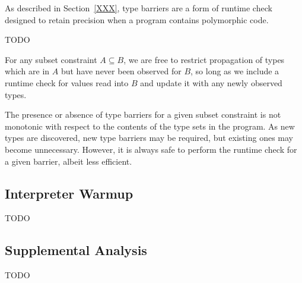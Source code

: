 As described in Section~\ref{XXX}, type barriers are a form of runtime
check designed to retain precision when a program contains polymorphic code.

TODO

For any subset constraint $A \subseteq B$, we are free to restrict
propagation of types which are in $A$ but have never been observed for $B$,
so long as we include a runtime check for values read into $B$ and update
it with any newly observed types.

The presence or absence of type barriers for a given subset constraint
is not monotonic with respect to the contents of the type sets in the program.
As new types are discovered, new type barriers may be required, but existing
ones may become unnecessary.
However, it is always safe to perform the runtime check for a given barrier,
albeit less efficient.

\subsection{Interpreter Warmup}

TODO

\subsection{Supplemental Analysis}

TODO
